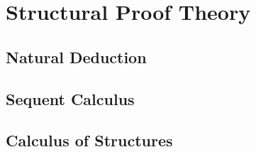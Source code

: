 \setchapterpreamble[u]{\margintoc}
\chapter{Structural Proof Theory}

\section{Natural Deduction}

\section{Sequent Calculus}

\section{Calculus of Structures}